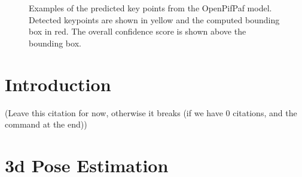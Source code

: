 \documentclass[conference]{IEEEtran}
\begin{document}
\begin{figure}[h]
    \centering
    \caption{Examples of the predicted key points from the OpenPifPaf model. Detected keypoints are shown in yellow and the computed bounding box in red. The overall confidence score is shown above the bounding box.}
    \label{img:keypoints}
\end{figure}


\section{Introduction}
\begin{center}
    \cite{main-article}
    (Leave this citation for now, otherwise it breaks (if we have 0 citations, and the command at the end))
\end{center}



\section{3d Pose Estimation}
\setcounter{MaxMatrixCols}{20}
\end{document}
